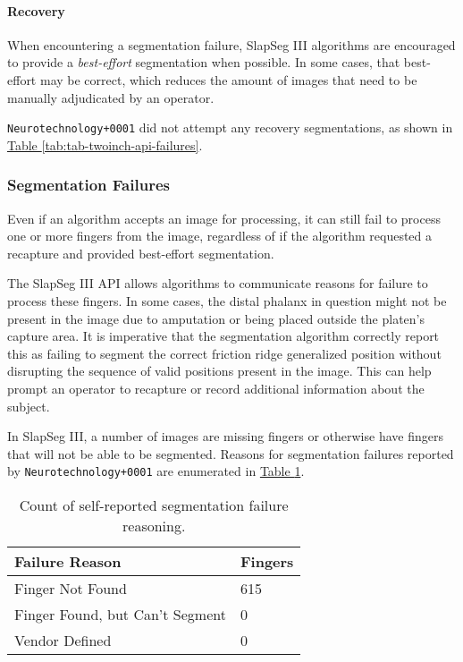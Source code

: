\documentclass[]{article}
\let\oldparagraph\paragraph
\renewcommand{\paragraph}[1]{\oldparagraph{#1}\mbox{}}
\begin{document}
\paragraph{Recovery}\label{twoinch-troublesome-recovery}

When encountering a segmentation failure, SlapSeg III algorithms are
encouraged to provide a \emph{best-effort} segmentation when possible.
In some cases, that best-effort may be correct, which reduces the amount
of images that need to be manually adjudicated by an operator.

\texttt{Neurotechnology+0001} did not attempt any recovery
segmentations, as shown in
\protect\hyperlink{tab:tab-twoinch-api-failures}{Table
\ref{tab:tab-twoinch-api-failures}}.

\subsubsection{Segmentation
Failures}\label{twoinch-segmentation-failure}

Even if an algorithm accepts an image for processing, it can still fail
to process one or more fingers from the image, regardless of if the
algorithm requested a recapture and provided best-effort segmentation.

The SlapSeg III API allows algorithms to communicate reasons for failure
to process these fingers. In some cases, the distal phalanx in question
might not be present in the image due to amputation or being placed
outside the platen's capture area. It is imperative that the
segmentation algorithm correctly report this as failing to segment the
correct friction ridge generalized position without disrupting the
sequence of valid positions present in the image. This can help prompt
an operator to recapture or record additional information about the
subject.

In SlapSeg III, a number of images are missing fingers or otherwise have
fingers that will not be able to be segmented. Reasons for segmentation
failures reported by \texttt{Neurotechnology+0001} are enumerated in
\protect\hyperlink{tab:twoinch-seg-fail}{Table
\ref{tab:twoinch-seg-fail}}.

\begin{table}[!h]

\caption{\label{tab:twoinch-seg-fail}Count of self-reported segmentation failure reasoning.}
\centering
\begin{tabular}{ll}
\toprule
Failure Reason & Fingers\\
\midrule
\rowcolor{gray!6}  Finger Not Found & 615\\
Finger Found, but Can't Segment & 0\\
\rowcolor{gray!6}  Vendor Defined & 0\\
\bottomrule
\end{tabular}
\end{table}
\end{document}
